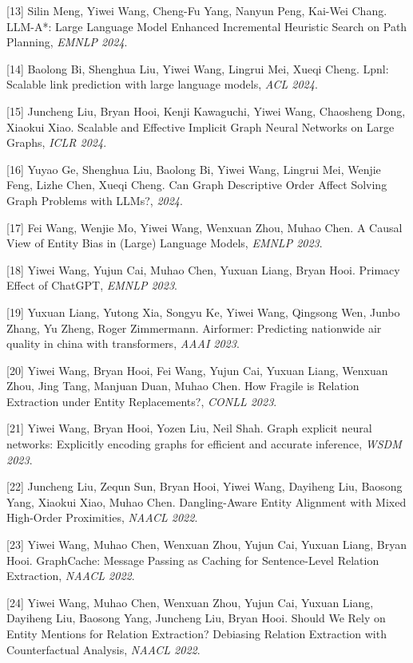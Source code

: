 [13] Silin Meng, Yiwei Wang, Cheng-Fu Yang, Nanyun Peng, Kai-Wei Chang. LLM-A*: Large Language Model Enhanced Incremental Heuristic Search on Path Planning, \textit{EMNLP 2024}.

[14] Baolong Bi, Shenghua Liu, Yiwei Wang, Lingrui Mei, Xueqi Cheng. Lpnl: Scalable link prediction with large language models, \textit{ACL 2024}.

[15] Juncheng Liu, Bryan Hooi, Kenji Kawaguchi, Yiwei Wang, Chaosheng Dong, Xiaokui Xiao. Scalable and Effective Implicit Graph Neural Networks on Large Graphs, \textit{ICLR 2024}.

[16] Yuyao Ge, Shenghua Liu, Baolong Bi, Yiwei Wang, Lingrui Mei, Wenjie Feng, Lizhe Chen, Xueqi Cheng. Can Graph Descriptive Order Affect Solving Graph Problems with LLMs?, \textit{ 2024}.

[17] Fei Wang, Wenjie Mo, Yiwei Wang, Wenxuan Zhou, Muhao Chen. A Causal View of Entity Bias in (Large) Language Models, \textit{EMNLP 2023}.

[18] Yiwei Wang, Yujun Cai, Muhao Chen, Yuxuan Liang, Bryan Hooi. Primacy Effect of ChatGPT, \textit{EMNLP 2023}.

[19] Yuxuan Liang, Yutong Xia, Songyu Ke, Yiwei Wang, Qingsong Wen, Junbo Zhang, Yu Zheng, Roger Zimmermann. Airformer: Predicting nationwide air quality in china with transformers, \textit{AAAI 2023}.

[20] Yiwei Wang, Bryan Hooi, Fei Wang, Yujun Cai, Yuxuan Liang, Wenxuan Zhou, Jing Tang, Manjuan Duan, Muhao Chen. How Fragile is Relation Extraction under Entity Replacements?, \textit{CONLL 2023}.

[21] Yiwei Wang, Bryan Hooi, Yozen Liu, Neil Shah. Graph explicit neural networks: Explicitly encoding graphs for efficient and accurate inference, \textit{WSDM 2023}.

[22] Juncheng Liu, Zequn Sun, Bryan Hooi, Yiwei Wang, Dayiheng Liu, Baosong Yang, Xiaokui Xiao, Muhao Chen. Dangling-Aware Entity Alignment with Mixed High-Order Proximities, \textit{NAACL 2022}.

[23] Yiwei Wang, Muhao Chen, Wenxuan Zhou, Yujun Cai, Yuxuan Liang, Bryan Hooi. GraphCache: Message Passing as Caching for Sentence-Level Relation Extraction, \textit{NAACL 2022}.

[24] Yiwei Wang, Muhao Chen, Wenxuan Zhou, Yujun Cai, Yuxuan Liang, Dayiheng Liu, Baosong Yang, Juncheng Liu, Bryan Hooi. Should We Rely on Entity Mentions for Relation Extraction? Debiasing Relation Extraction with Counterfactual Analysis, \textit{NAACL 2022}.

